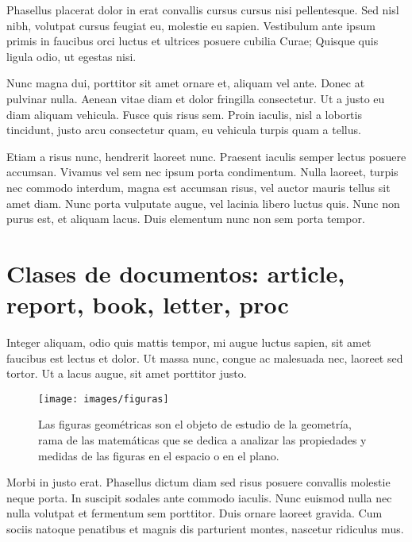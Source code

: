 \documentclass[12pt,a4paper]{report}
\begin{document}
Phasellus placerat dolor in erat convallis cursus cursus nisi pellentesque. Sed nisl nibh, volutpat cursus feugiat eu, molestie eu sapien. Vestibulum ante ipsum primis in faucibus orci luctus et ultrices posuere cubilia Curae; Quisque quis ligula odio, ut egestas nisi. 

Nunc magna dui, porttitor sit amet ornare et, aliquam vel ante. Donec at pulvinar nulla. Aenean vitae diam et dolor fringilla consectetur. Ut a justo eu diam aliquam vehicula. Fusce quis risus sem. Proin iaculis, nisl a lobortis tincidunt, justo arcu consectetur quam, eu vehicula turpis quam a tellus.

Etiam a risus nunc, hendrerit laoreet nunc. Praesent iaculis semper lectus posuere accumsan. Vivamus vel sem nec ipsum porta condimentum. Nulla laoreet, turpis nec commodo interdum, magna est accumsan risus, vel auctor mauris tellus sit amet diam. Nunc porta vulputate augue, vel lacinia libero luctus quis. Nunc non purus est, et aliquam lacus. Duis elementum nunc non sem porta tempor.





\section{Clases de documentos: article, report, book, letter, proc}
\label{seccion.clases}



Integer aliquam, odio quis mattis tempor, mi augue luctus sapien, sit amet faucibus est lectus et dolor. Ut massa nunc, congue ac malesuada nec, laoreet sed tortor. Ut a lacus augue, sit amet porttitor justo. 



\begin{wrapfigure}[20]{r}{6cm}
\centering
\texttt{[image: images/figuras]}
\caption{Las figuras geométricas son el objeto de estudio de la geometría, rama de las matemáticas que se dedica a analizar las propiedades y medidas de las figuras en el espacio o en el plano.}
\label{fig.plantulas}
\end{wrapfigure}



Morbi in justo erat. Phasellus dictum diam sed risus posuere convallis molestie neque porta. In suscipit sodales ante commodo iaculis. Nunc euismod nulla nec nulla volutpat et fermentum sem porttitor. Duis ornare laoreet gravida. Cum sociis natoque penatibus et magnis dis parturient montes, nascetur ridiculus mus. 
\end{document}
